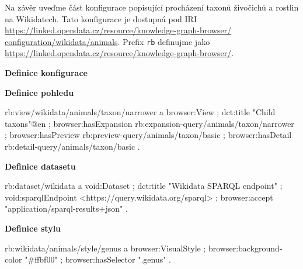 \begin{prikl}
Na závěr uveďme část konfigurace popisující procházení taxonů živočichů a rostlin na Wikidatech. Tato konfigurace je dostupná pod IRI \\\href{https://linked.opendata.cz/resource/knowledge-graph-browser/configuration/wikidata/animals}{https://linked.opendata.cz/resource/knowledge-graph-browser/}\\\href{https://linked.opendata.cz/resource/knowledge-graph-browser/configuration/wikidata/animals}{configuration/wikidata/animals}. Prefix \texttt{rb} definujme jako \\\url{https://linked.opendata.cz/resource/knowledge-graph-browser/}.

\smallskip

\textbf{Definice konfigurace}

\textbf{Definice pohledu}
\begin{code}
rb:view/wikidata/animals/taxon/narrower a browser:View ;
    dct:title "Child taxons"@en ;
    browser:hasExpansion rb:expansion-query/animals/taxon/narrower ;
    browser:hasPreview rb:preview-query/animals/taxon/basic ;
    browser:hasDetail rb:detail-query/animals/taxon/basic .
\end{code}

\textbf{Definice datasetu}
\begin{code}
rb:dataset/wikidata a void:Dataset ;
    dct:title "Wikidata SPARQL endpoint" ;
    void:sparqlEndpoint <https://query.wikidata.org/sparql> ;
    browser:accept "application/sparql-results+json" .
\end{code}

\textbf{Definice stylu}
\begin{code}
rb:wikidata/animals/style/genus a browser:VisualStyle ;
    browser:background-color "#ffbf00" ;
    browser:hasSelector ".genus" .
\end{code}
\end{prikl}


